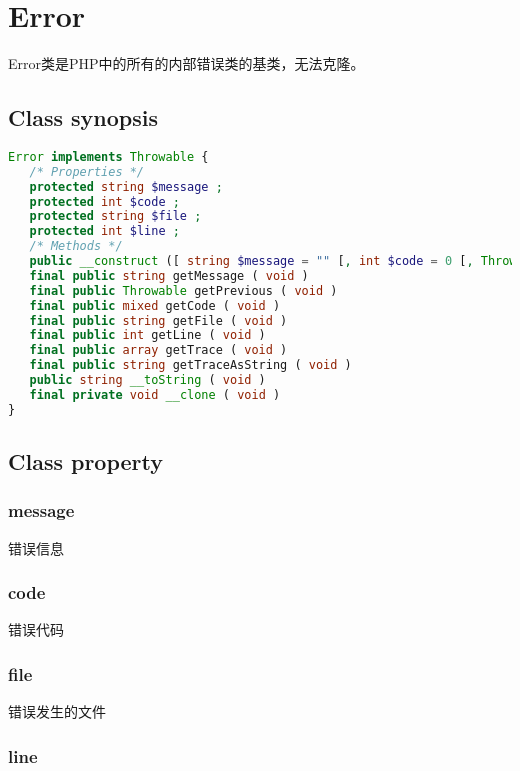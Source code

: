 \chapter{Error}


Error类是PHP中的所有的内部错误类的基类，无法克隆。

\section{Class synopsis}

\begin{lstlisting}[language=PHP]
Error implements Throwable {
   /* Properties */
   protected string $message ;
   protected int $code ;
   protected string $file ;
   protected int $line ;
   /* Methods */
   public __construct ([ string $message = "" [, int $code = 0 [, Throwable $previous = NULL ]]] )
   final public string getMessage ( void )
   final public Throwable getPrevious ( void )
   final public mixed getCode ( void )
   final public string getFile ( void )
   final public int getLine ( void )
   final public array getTrace ( void )
   final public string getTraceAsString ( void )
   public string __toString ( void )
   final private void __clone ( void )
}
\end{lstlisting}

\section{Class property}


\subsection{message}

错误信息

\subsection{code}

错误代码

\subsection{file}


错误发生的文件


\subsection{line}

